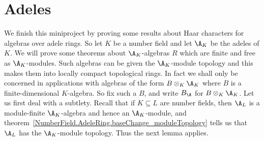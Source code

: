 \section{Adeles}

We finish this miniproject by proving some results about Haar characters for
algebras over adele rings.
So let $K$ be a number field and let $\A_K$ be the adeles of $K$.
We will prove some theorems about $\A_K$-algebras $R$ which are finite
and free as $\A_K$-modules. Such algebras can be given the $\A_K$-module topology
and this makes them into locally compact topological rings. In fact we shall only be concerned
in applications with algebras of the form $B\otimes_K\A_K$ where $B$ is a finite-dimensional
$K$-algebra. So fix such a $B$, and write $B_{\A}$ for $B\otimes_K\A_K$. Let us first
deal with a subtlety. Recall that if $K\subseteq L$ are number fields, then $\A_L$ is a
module-finite $\A_K$-algebra and hence an $\A_K$-module, and
theorem~\ref{NumberField.AdeleRing.baseChange_moduleTopology}
tells us that $\A_L$ has the $\A_K$-module topology. Thus the next lemma applies.

